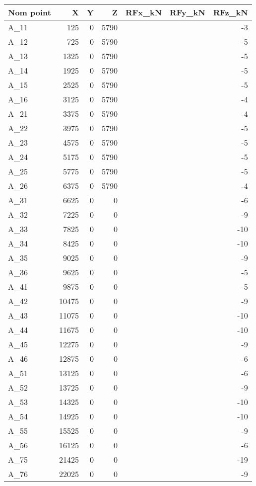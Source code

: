 \begin{tabular}{lrrrllr}
\toprule
Nom point & X & Y & Z & RFx\_kN & RFy\_kN & RFz\_kN \\
\midrule
A\_11 & 125 & 0 & 5790 &  &  & -3 \\
A\_12 & 725 & 0 & 5790 &  &  & -5 \\
A\_13 & 1325 & 0 & 5790 &  &  & -5 \\
A\_14 & 1925 & 0 & 5790 &  &  & -5 \\
A\_15 & 2525 & 0 & 5790 &  &  & -5 \\
A\_16 & 3125 & 0 & 5790 &  &  & -4 \\
A\_21 & 3375 & 0 & 5790 &  &  & -4 \\
A\_22 & 3975 & 0 & 5790 &  &  & -5 \\
A\_23 & 4575 & 0 & 5790 &  &  & -5 \\
A\_24 & 5175 & 0 & 5790 &  &  & -5 \\
A\_25 & 5775 & 0 & 5790 &  &  & -5 \\
A\_26 & 6375 & 0 & 5790 &  &  & -4 \\
A\_31 & 6625 & 0 & 0 &  &  & -6 \\
A\_32 & 7225 & 0 & 0 &  &  & -9 \\
A\_33 & 7825 & 0 & 0 &  &  & -10 \\
A\_34 & 8425 & 0 & 0 &  &  & -10 \\
A\_35 & 9025 & 0 & 0 &  &  & -9 \\
A\_36 & 9625 & 0 & 0 &  &  & -5 \\
A\_41 & 9875 & 0 & 0 &  &  & -5 \\
A\_42 & 10475 & 0 & 0 &  &  & -9 \\
A\_43 & 11075 & 0 & 0 &  &  & -10 \\
A\_44 & 11675 & 0 & 0 &  &  & -10 \\
A\_45 & 12275 & 0 & 0 &  &  & -9 \\
A\_46 & 12875 & 0 & 0 &  &  & -6 \\
A\_51 & 13125 & 0 & 0 &  &  & -6 \\
A\_52 & 13725 & 0 & 0 &  &  & -9 \\
A\_53 & 14325 & 0 & 0 &  &  & -10 \\
A\_54 & 14925 & 0 & 0 &  &  & -10 \\
A\_55 & 15525 & 0 & 0 &  &  & -9 \\
A\_56 & 16125 & 0 & 0 &  &  & -6 \\
A\_75 & 21425 & 0 & 0 &  &  & -19 \\
A\_76 & 22025 & 0 & 0 &  &  & -9 \\

\end{tabular}
